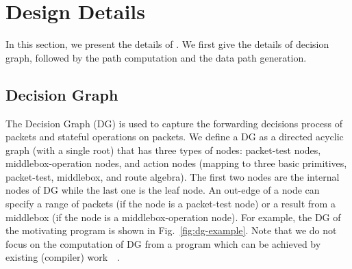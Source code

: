 \section{Design Details}\label{sec:details}

In this section, we present the details of \concept{}. We
first give the details of decision graph, followed by the path
computation and the data path generation. 

\vspace{-2mm}
\subsection{Decision Graph}

The Decision Graph (DG) is used to capture the forwarding decisions process of
packets and stateful operations on packets. 
We define a DG as a directed acyclic graph (with a single root) that has three types of nodes: packet-test nodes, middlebox-operation nodes, and action nodes (mapping to three basic primitives, packet-test, middlebox, and route algebra). The first two nodes are the internal nodes of DG while the last one is the leaf node. An out-edge of a node can specify a range of packets (if the node is a packet-test node) or a result from a middlebox (if the node is a middlebox-operation node). For example, the DG of the motivating program is shown in Fig.~\ref{fig:dg-example}. Note that we do not focus on the computation of DG from a program which can be achieved by existing (compiler) work~\cite{arashloo2016snap}~\cite{smolka2015fast}.

